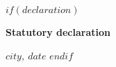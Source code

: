 




$if(declaration)$
\cleardoublepage

\thispagestyle{empty}

\vspace*{\fill}

\textbf{Statutory declaration}


\vspace{20mm}

\noindent\textit{$city$, $date$}
$endif$
